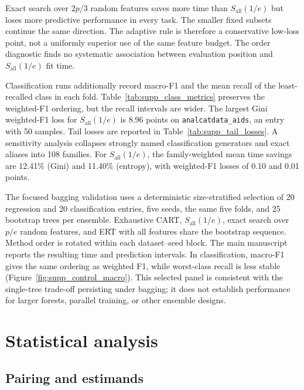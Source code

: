 \documentclass[final,5p,times,twocolumn]{elsarticle}
\begin{document}


Exact search over \(2p/3\) random features saves more time than
\(S_{\mathrm{all}}(1/e)\) but loses more predictive performance in every task.
The smaller fixed subsets continue the same direction.  The adaptive rule is
therefore a conservative low-loss point, not a uniformly superior use of the
same feature budget.  The order diagnostic finds no systematic association
between evaluation position and \(S_{\mathrm{all}}(1/e)\) fit time.

Classification runs additionally record macro-F1 and the mean recall of the
least-recalled class in each fold.  Table~\ref{tab:supp_class_metrics} preserves
the weighted-F1 ordering, but the recall intervals are wider.  The largest
Gini weighted-F1 loss for \(S_{\mathrm{all}}(1/e)\) is 8.96 points on
\texttt{analcatdata\_aids}, an entry with 50 samples.  Tail losses are reported
in Table~\ref{tab:supp_tail_losses}.  A sensitivity analysis collapses strongly
named classification generators and exact aliases into 108 families.  For
\(S_{\mathrm{all}}(1/e)\), the family-weighted mean time savings are 12.41\%
(Gini) and 11.40\% (entropy), with weighted-F1 losses of 0.10 and 0.01 points.





The focused bagging validation uses a deterministic size-stratified selection
of 20 regression and 20 classification entries, five seeds, the same five
folds, and 25 bootstrap trees per ensemble.  Exhaustive CART,
\(S_{\mathrm{all}}(1/e)\), exact search over \(p/e\) random features, and ERT
with all features share the bootstrap sequence.  Method order is rotated within
each dataset--seed block.  The main manuscript reports the resulting time and
prediction intervals.  In classification, macro-F1 gives the same ordering as
weighted F1, while worst-class recall is less stable
(Figure~\ref{fig:supp_control_macro}).  This selected panel is consistent with
the single-tree trade-off persisting under bagging; it does not establish
performance for larger forests, parallel training, or other ensemble designs.

\section{Statistical analysis}
\label{sec:supp_inference}

\subsection{Pairing and estimands}
\end{document}
